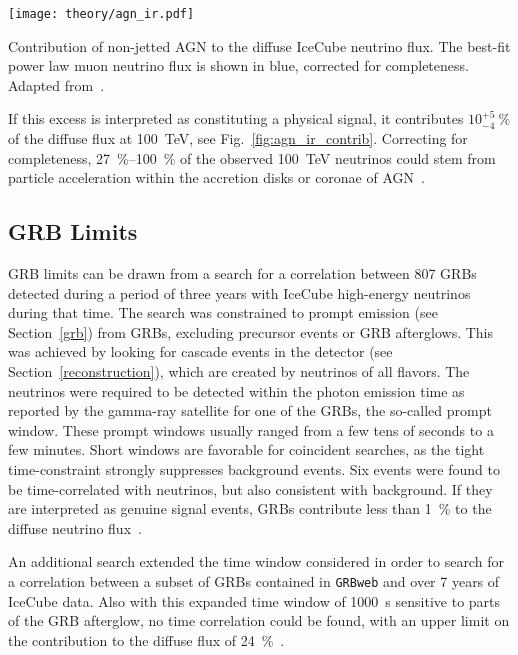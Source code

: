 \begin{marginfigure}
    \texttt{[image: theory/agn\_ir.pdf]}
    \caption[Non-jetted AGN]{Contribution of non-jetted AGN to the diffuse IceCube neutrino flux. The best-fit power law muon neutrino flux is shown in blue, corrected for completeness. Adapted from~\cite{Abbasi2022c}.}
\end{marginfigure}

If this excess is interpreted as constituting a physical signal, it contributes $10^{+5}_{-4} ~\%$ of the diffuse flux at \SI{100}{\tera\eV}, see Fig.~\ref{fig:agn_ir_contrib}. Correcting for completeness, \SIrange{27}{100}{\percent} of the observed \SI{100}{\tera\eV} neutrinos could stem from particle acceleration within the accretion disks or coronae of AGN~\cite{Abbasi2022c}.

\subsection{GRB Limits}
GRB limits can be drawn from a search for a correlation between 807 GRBs detected during a period of three years with IceCube high-energy neutrinos during that time. The search was constrained to prompt emission (see Section~\ref{grb}) from GRBs, excluding precursor events or GRB afterglows. This was achieved by looking for cascade events in the detector (see Section~\ref{reconstruction}), which are created by neutrinos of all flavors. The neutrinos were required to be detected within the photon emission time as reported by the gamma-ray satellite for one of the GRBs, the so-called prompt window. These prompt windows usually ranged from a few tens of seconds to a few minutes. Short windows are favorable for coincident searches, as the tight time-constraint strongly suppresses background events. Six events were found to be time-correlated with neutrinos, but also consistent with background. If they are interpreted as genuine signal events, GRBs contribute less than \SI{1}{\percent} to the diffuse neutrino flux~.

An additional search extended the time window considered in order to search for a correlation between a subset of GRBs contained in \texttt{GRBweb} and over 7 years of IceCube data. Also with this expanded time window of \SI{1000}{\s} sensitive to parts of the GRB afterglow, no time correlation could be found, with an upper limit on the contribution to the diffuse flux of \SI{24}{\percent}~.


